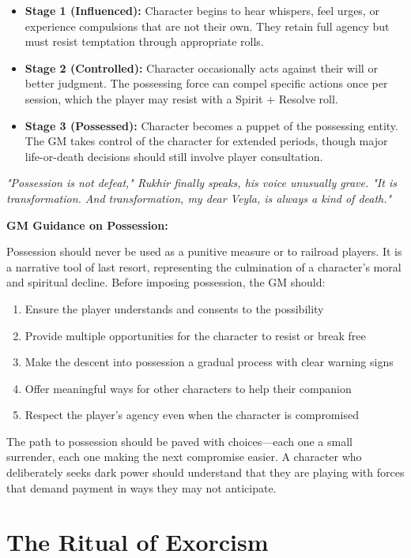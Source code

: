 \documentclass[12pt,twoside]{book}
\newcommand{\shadow}[1]{\textit{#1}}
\begin{document}
\begin{itemize}
\item \textbf{Stage 1 (Influenced):} Character begins to hear whispers, feel urges, or experience compulsions that are not their own. They retain full agency but must resist temptation through appropriate rolls.
\item \textbf{Stage 2 (Controlled):} Character occasionally acts against their will or better judgment. The possessing force can compel specific actions once per session, which the player may resist with a Spirit + Resolve roll.
\item \textbf{Stage 3 (Possessed):} Character becomes a puppet of the possessing entity. The GM takes control of the character for extended periods, though major life-or-death decisions should still involve player consultation.
\end{itemize}

\shadow{"Possession is not defeat," Rukhir finally speaks, his voice unusually grave. "It is transformation. And transformation, my dear Veyla, is always a kind of death."}

\textbf{GM Guidance on Possession:}

Possession should never be used as a punitive measure or to railroad players. It is a narrative tool of last resort, representing the culmination of a character's moral and spiritual decline. Before imposing possession, the GM should:

\begin{enumerate}
\item Ensure the player understands and consents to the possibility
\item Provide multiple opportunities for the character to resist or break free
\item Make the descent into possession a gradual process with clear warning signs
\item Offer meaningful ways for other characters to help their companion
\item Respect the player's agency even when the character is compromised
\end{enumerate}

The path to possession should be paved with choices—each one a small surrender, each one making the next compromise easier. A character who deliberately seeks dark power should understand that they are playing with forces that demand payment in ways they may not anticipate.

\section*{The Ritual of Exorcism}
\end{document}

